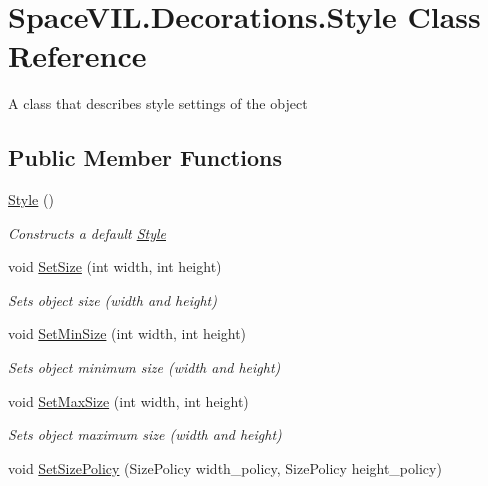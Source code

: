\hypertarget{class_space_v_i_l_1_1_decorations_1_1_style}{}\section{Space\+V\+I\+L.\+Decorations.\+Style Class Reference}
\label{class_space_v_i_l_1_1_decorations_1_1_style}


A class that describes style settings of the object  


\subsection*{Public Member Functions}
\begin{DoxyCompactItemize}
\item 
\mbox{\hyperlink{class_space_v_i_l_1_1_decorations_1_1_style_a433e3e497a0884da5d49d327b8ca6703}{Style}} ()
\begin{DoxyCompactList}\small\item\em Constructs a default \mbox{\hyperlink{class_space_v_i_l_1_1_decorations_1_1_style}{Style}} \end{DoxyCompactList}\item 
void \mbox{\hyperlink{class_space_v_i_l_1_1_decorations_1_1_style_ad717063e990bca9bc576e7321f6775cf}{Set\+Size}} (int width, int height)
\begin{DoxyCompactList}\small\item\em Sets object size (width and height) \end{DoxyCompactList}\item 
void \mbox{\hyperlink{class_space_v_i_l_1_1_decorations_1_1_style_a5203493f4987e3ab38153597e1d688b5}{Set\+Min\+Size}} (int width, int height)
\begin{DoxyCompactList}\small\item\em Sets object minimum size (width and height) \end{DoxyCompactList}\item 
void \mbox{\hyperlink{class_space_v_i_l_1_1_decorations_1_1_style_acc17b444be91954f7fb97cee528f15dd}{Set\+Max\+Size}} (int width, int height)
\begin{DoxyCompactList}\small\item\em Sets object maximum size (width and height) \end{DoxyCompactList}\item 
void \mbox{\hyperlink{class_space_v_i_l_1_1_decorations_1_1_style_a8c0e9f641e6576369d950300d460d51d}{Set\+Size\+Policy}} (Size\+Policy width\+\_\+policy, Size\+Policy height\+\_\+policy)

\end{DoxyCompactItemize}
